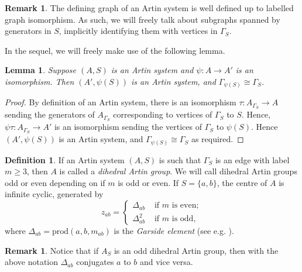 \documentclass[svgnames]{amsart}
\theoremstyle{plain}
\newtheorem{lemma}[thm]{Lemma}
\theoremstyle{definition}
\newtheorem{defn}[thm]{Definition}
\newtheorem{rem}[thm]{Remark}
\begin{document}
\begin{rem}
The defining graph of an Artin system is well defined up to labelled graph isomorphism. As such, we will freely talk about subgraphs spanned by generators in $S$, implicitly identifying them with vertices in $\Gamma_S$.
\end{rem}

\noindent In the sequel, we will freely make use of the following lemma.

\begin{lemma}\label{lem:isomorphismspreserveags}
    Suppose $(A,S)$ is an Artin system and $\psi : A \rightarrow A'$ is an isomorphism. Then $(A', \psi(S))$ is an Artin system, and $\Gamma_{\psi(S)} \cong \Gamma_S$.
\end{lemma}
\begin{proof}
    By definition of an Artin system, there is an isomorphism $\tau: A_{\Gamma_S} \rightarrow A$ sending the generators of $A_{\Gamma_S}$ corresponding to vertices of $\Gamma_S$ to $S$. Hence, $\psi\tau: A_{\Gamma_S} \rightarrow A'$ is an isomorphism sending the vertices of $\Gamma_S$ to $\psi(S)$. Hence $(A', \psi(S))$ is an Artin system, and $\Gamma_{\psi(S)} \cong \Gamma_S$ as required.
\end{proof}



\begin{defn}\label{defn:dihedral}
If an Artin system $(A,S)$ is such that $\Gamma_S$ is an edge with label $m\ge 3$, then $A$ is called a \emph{dihedral Artin group}. We will call dihedral Artin groups odd or even depending on if $m$ is odd or even. If $S=\{a,b\}$, the centre of $A$ is infinite cyclic, generated by 
\[z_{ab}=\begin{cases}
\Delta_{ab}     &\mbox{ if $m$ is even};\\
\Delta_{ab}^2   &\mbox{ if $m$ is odd},
\end{cases}\]
where $\Delta_{ab}=\mathrm{prod}(a,b,m_{ab})$ is the \emph{Garside element} (see e.g. \cite{BrieskornSaito}).
\end{defn}



\begin{rem}\label{rem:oddConjugation}
    Notice that if $A_S$ is an odd dihedral Artin group, then with the above notation $\Delta_{ab}$ conjugates $a$ to $b$ and vice versa.
\end{rem}
\end{document}
